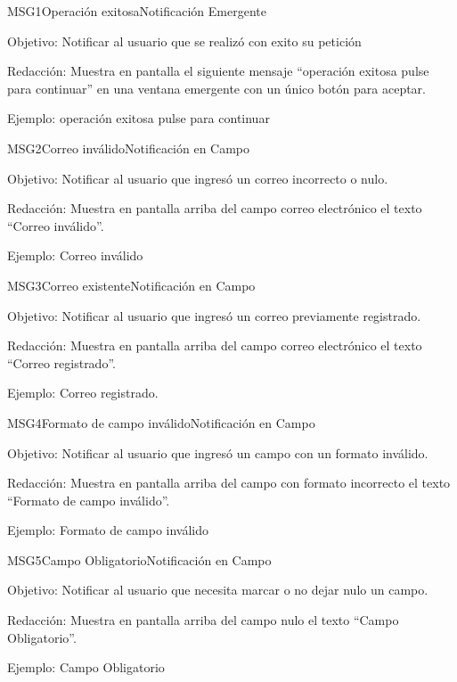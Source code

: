 \begin{mensaje}{MSG1}{Operación exitosa}{Notificación Emergente}
	\item[Objetivo:] Notificar al usuario que se realizó con exito su petición  
	\item[Redacción:] Muestra en pantalla el siguiente mensaje “operación exitosa pulse para continuar” en una ventana emergente con un único botón para aceptar.
	\item[Ejemplo:] operación exitosa pulse para continuar
\end{mensaje}

\begin{mensaje}{MSG2}{Correo inválido}{Notificación en Campo}
	\item[Objetivo:] Notificar al usuario que ingresó un correo incorrecto o nulo.  
	\item[Redacción:] Muestra en pantalla arriba del campo correo electrónico el texto “Correo inválido”.
	\item[Ejemplo:] Correo inválido
\end{mensaje}

\begin{mensaje}{MSG3}{Correo existente}{Notificación en Campo}
	\item[Objetivo:] Notificar al usuario que ingresó un correo previamente registrado.
	\item[Redacción:] Muestra en pantalla arriba del campo correo electrónico el texto “Correo registrado”.
	\item[Ejemplo:] Correo registrado.
\end{mensaje}

\begin{mensaje}{MSG4}{Formato de campo inválido}{Notificación en Campo}
	\item[Objetivo:] Notificar al usuario que ingresó un campo con un formato inválido.  
	\item[Redacción:] Muestra en pantalla arriba del campo con formato incorrecto el texto “Formato de campo inválido”.
	\item[Ejemplo:] Formato de campo inválido
\end{mensaje}

\begin{mensaje}{MSG5}{Campo Obligatorio}{Notificación en Campo}
	\item[Objetivo:] Notificar al usuario que necesita marcar o no dejar nulo un campo.
	\item[Redacción:] Muestra en pantalla arriba del campo nulo el texto “Campo Obligatorio”.
	\item[Ejemplo:] Campo Obligatorio
\end{mensaje}

